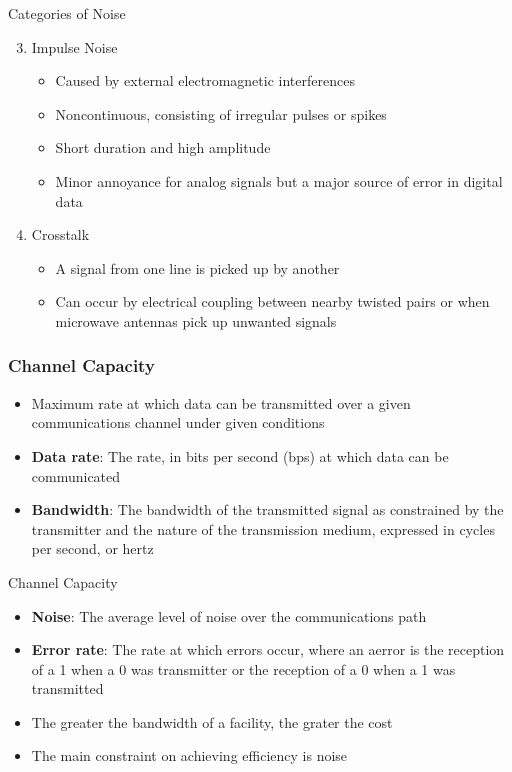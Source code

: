 \documentclass[pdflatex,compress]{beamer}
\begin{document}
\begin{frame}{Categories of Noise}
	\begin{enumerate}
		\setcounter{enumi}{2}
		\item Impulse Noise
		\begin{itemize}
			\item Caused by external electromagnetic interferences
			\item Noncontinuous, consisting of irregular pulses or spikes
			\item Short duration and high amplitude
			\item Minor annoyance for analog signals but a major source of error in digital data
		\end{itemize}
		\item Crosstalk
		\begin{itemize}
			\item A signal from one line is picked up by another
			\item Can occur by electrical coupling between nearby twisted pairs or when microwave antennas pick up unwanted signals
		\end{itemize}
	\end{enumerate}
\end{frame}

\begin{frame}
	\frametitle{Channel Capacity}
	\begin{itemize}
		\item Maximum rate at which data can be transmitted over a given communications channel under given conditions
		\item \textbf{Data rate}: The rate, in bits per second (bps) at which data can be communicated
		\item \textbf{Bandwidth}: The bandwidth of the transmitted signal as constrained by the transmitter and the nature of the transmission medium, expressed in cycles per second, or hertz
	\end{itemize}
\end{frame}

\begin{frame}{Channel Capacity}
	\begin{itemize}
		\item \textbf{Noise}: The average level of noise over the communications path
		\item \textbf{Error rate}: The rate at which errors occur, where an aerror is the reception of a 1 when a 0 was transmitter or the reception of a 0 when a 1 was transmitted
		\item The greater the bandwidth of a facility, the grater the cost
		\item The main constraint on achieving efficiency is noise
	\end{itemize}
\end{frame}
\end{document}
